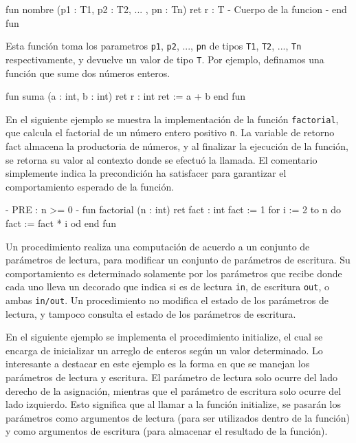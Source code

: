 \begin{pascallike}
fun nombre (p1 : T1, p2 : T2, ... , pn : Tn) ret r : T
    {- Cuerpo de la funcion -}
end fun 
\end{pascallike}
Esta función toma los parametros \texttt{p1}, \texttt{p2}, ..., \texttt{pn} de tipos \texttt{T1}, \texttt{T2}, ..., \texttt{Tn} respectivamente, y devuelve un valor de tipo \texttt{T}. Por ejemplo, definamos una función que sume dos números enteros.

\begin{pascallike}
fun suma (a : int, b : int) ret r : int
    ret := a + b
end fun
\end{pascallike}

En el siguiente ejemplo se muestra la implementación de la función \texttt{factorial}, que calcula el factorial de un número entero positivo \texttt{n}. La variable de retorno fact almacena la productoria de números, y al finalizar la ejecución de la función, se retorna su valor al contexto donde se efectuó la llamada. El comentario simplemente indica la precondición ha satisfacer para garantizar el comportamiento esperado de la función.

\begin{pascallike}
{- PRE : n >= 0 -}
fun factorial (n : int) ret fact : int
    fact := 1
    for i := 2 to n do
        fact := fact * i
    od
end fun
\end{pascallike}

Un procedimiento realiza una computación de acuerdo a un conjunto de parámetros de lectura, para modificar un conjunto de parámetros de escritura. Su comportamiento es determinado solamente por los parámetros que recibe donde cada uno lleva un decorado que indica si es de lectura \texttt{in}, de escritura \texttt{out}, o ambas \texttt{in/out}. Un procedimiento no modifica el estado de los parámetros de lectura, y tampoco consulta el estado de los parámetros de escritura.

En el siguiente ejemplo se implementa el procedimiento initialize, el cual se encarga de inicializar un arreglo de enteros según un valor determinado. Lo interesante a destacar en este ejemplo es la forma en que se manejan los parámetros de lectura y escritura. El parámetro de lectura solo ocurre del lado derecho de la asignación, mientras que el parámetro de escritura solo ocurre del lado izquierdo. Esto significa que al llamar a la función initialize, se pasarán los parámetros como argumentos de lectura (para ser utilizados dentro de la función) y como argumentos de escritura (para almacenar el resultado de la función).

